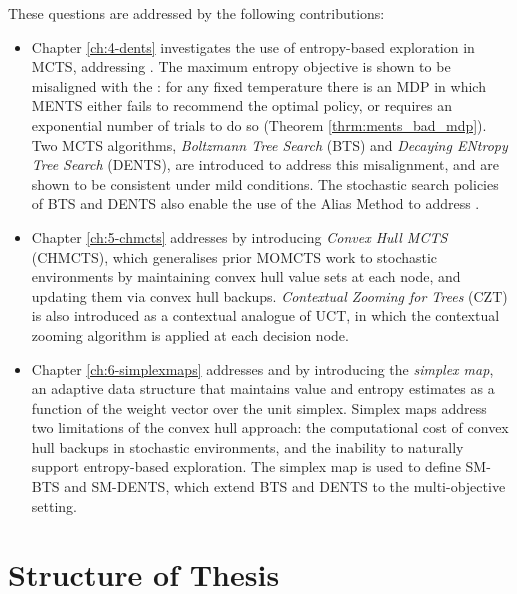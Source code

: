     These questions are addressed by the following contributions:
    \begin{itemize}
        \item Chapter \ref{ch:4-dents} investigates the use of entropy-based exploration in MCTS, addressing \entropyq. The maximum entropy objective is shown to be misaligned with the : for any fixed temperature there is an MDP in which MENTS either fails to recommend the optimal policy, or requires an exponential number of trials to do so (Theorem \ref{thrm:ments_bad_mdp}). Two MCTS algorithms, \textit{Boltzmann Tree Search} (BTS) and \textit{Decaying ENtropy Tree Search} (DENTS), are introduced to address this misalignment, and are shown to be consistent under mild conditions. The stochastic search policies of BTS and DENTS also enable the use of the Alias Method to address \complexityq.

        \item Chapter \ref{ch:5-chmcts} addresses \stochq\ewe by introducing \textit{Convex Hull MCTS} (CHMCTS), which generalises prior MOMCTS work to stochastic environments by maintaining convex hull value sets at each node, and updating them via convex hull backups. \textit{Contextual Zooming for Trees} (CZT) is also introduced as a contextual analogue of UCT, in which the contextual zooming algorithm is applied at each decision node. %

        \item Chapter \ref{ch:6-simplexmaps} addresses \contextq\ewe and \moscalabilityq\ewe by introducing the \textit{simplex map}, an adaptive data structure that maintains value and entropy estimates as a function of the weight vector over the unit simplex. Simplex maps address two limitations of the convex hull approach: the computational cost of convex hull backups in stochastic environments, and the inability to naturally support entropy-based exploration. The simplex map is used to define SM-BTS and SM-DENTS, which extend BTS and DENTS to the multi-objective setting.
    \end{itemize}



\section{Structure of Thesis}
\label{sec:1-4-thesis-structure}

